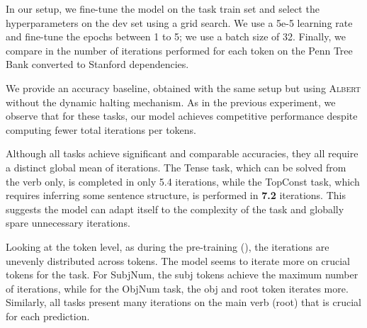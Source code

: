 In our setup, we fine-tune the model on the task train set and select the hyperparameters on the dev set using a grid search. We use a 5e-5 learning rate and fine-tune the epochs between 1 to 5; we use a batch size of 32.
Finally, we %
compare in  the number of iterations performed for each token 
on the Penn Tree Bank \parencite{marcus_94} converted to Stanford dependencies.

We provide an accuracy baseline, obtained with the same setup but using \textsc{Albert}  without the dynamic halting mechanism. As in the previous experiment, we observe that for these tasks, our model achieves competitive performance despite computing fewer total iterations per tokens.

Although all tasks achieve significant and comparable accuracies, they all require a distinct global mean of iterations. The Tense task, which can be solved from the verb only, is completed in only 5.4 iterations, while the TopConst task, which requires inferring some sentence structure, is performed in \textbf{7.2} iterations. This suggests the model can adapt itself to the complexity of the task and globally spare unnecessary iterations. 

Looking at the token level, as during the pre-training (), the iterations are unevenly distributed across tokens. The model seems to iterate more on crucial tokens for the task. For SubjNum, the subj tokens achieve the maximum number of iterations, while for the ObjNum task, the obj and root token iterates more. Similarly, all tasks present many iterations on the main verb (root) that is crucial for each prediction.

